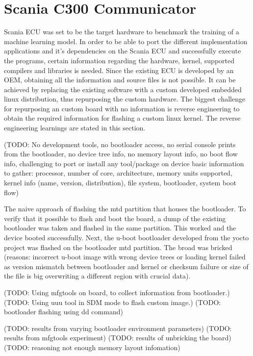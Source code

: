 \chapter{Scania C300 Communicator} \label{rtc-c300}
Scania ECU was set to be the target hardware to benchmark the training of a machine learning model. In order to be able to port the different implementation applications and it's dependencies on the Scania ECU and successfully execute the programs, certain information regarding the hardware, kernel, supported compilers and libraries is needed. Since the existing ECU is developed by an OEM, obtaining all the information and source files is not possible. 
It can be achieved by replacing the existing software with a custom developed embedded linux distribution, thus repurposing the custom hardware. 
The biggest challenge for repurposing an custom board with no information is reverse engineering to obtain the required information for flashing a custom linux kernel. The reverse engineering learnings are stated in this section.


(TODO: No development tools, no bootloader access, no serial console prints from the bootloader, no device tree info, no memory layout info, no boot flow info, challenging to port or install any tool/package on device 
basic information to gather: processor, number of core, architecture, memory units supported, kernel info (name, version, distribution), file system, bootloader, system boot flow)




The naive approach of flashing the mtd partition that houses the bootloader. To verify that it possible to flash and boot the board, a dump of the existing bootloader was taken and flashed in the same partition. This worked and the device booted successfully. Next, the u-boot bootloader developed from the yocto project was flashed on the bootloader mtd partition. The broad was bricked (reasons: incorrect u-boot image with wrong device trees or loading kernel failed as version mismatch between bootloader and kernel or checksum failure or size of the file is big overwriting a different region with crucial data).

(TODO: Using mfgtools on board, to collect information from bootloader.) 
(TODO: Using uuu tool in SDM mode to flash custom image.)
(TODO: bootloader flashing using dd command)

(TODO: results from varying bootloader environment parameters)
(TODO: results from mfgtools experiment)
(TODO: results of unbricking the board) 
(TODO: reasoning not enough memory layout infomation)
